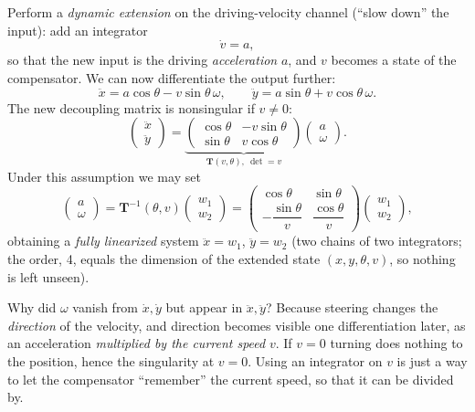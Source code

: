 \documentclass[11pt,a4paper]{article}
\newcommand{\vect}[1]{\bm{#1}}
\theoremstyle{plain}
\theoremstyle{definition}
\theoremstyle{remark}
\begin{document}
Perform a \emph{dynamic extension} on the driving-velocity channel (``slow down'' the input): add an integrator
\[
\dot v=a,
\]
so that the new input is the driving \emph{acceleration} $a$, and $v$ becomes a state of the compensator. We can now differentiate the output further:
\[
\ddot x=a\cos\theta-v\sin\theta\,\omega,\qquad \ddot y=a\sin\theta+v\cos\theta\,\omega .
\]
The new decoupling matrix is nonsingular if $v\neq0$:
\[
\begin{pmatrix}\ddot x\\\ddot y\end{pmatrix}=\underbrace{\begin{pmatrix}\cos\theta&-v\sin\theta\\\sin\theta&v\cos\theta\end{pmatrix}}_{\vect T(v,\theta),\ \det=v}\begin{pmatrix}a\\\omega\end{pmatrix}.
\]
Under this assumption we may set
\[
\begin{pmatrix}a\\\omega\end{pmatrix}=\vect T^{-1}(\theta,v)\begin{pmatrix}w_1\\w_2\end{pmatrix}=\begin{pmatrix}\cos\theta&\sin\theta\\-\dfrac{\sin\theta}{v}&\dfrac{\cos\theta}{v}\end{pmatrix}\begin{pmatrix}w_1\\w_2\end{pmatrix},
\]
obtaining a \emph{fully linearized} system $\ddot x=w_1$, $\ddot y=w_2$ (two chains of two integrators; the order, 4, equals the dimension of the extended state $(x,y,\theta,v)$, so nothing is left unseen).

\begin{intuition}
Why did $\omega$ vanish from $\dot x,\dot y$ but appear in $\ddot x,\ddot y$? Because steering changes the \emph{direction} of the velocity, and direction becomes visible one differentiation later, as an acceleration \emph{multiplied by the current speed} $v$. If $v=0$ turning does nothing to the position, hence the singularity at $v=0$. Using an integrator on $v$ is just a way to let the compensator ``remember'' the current speed, so that it can be divided by.
\end{intuition}
\end{document}
